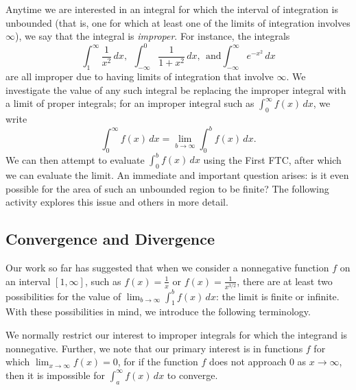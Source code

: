 Anytime we are interested in an integral for which the interval of integration is unbounded (that is, one for which at least one of the limits of integration involves $\infty$), we say that the integral is \emph{improper}.  For instance, the integrals
$$\int_1^{\infty} \frac{1}{x^2} \, dx, \ \ \int_{-\infty}^0 \frac{1}{1+x^2} \, dx, \ \ \mbox{and} \int_{-\infty}^{\infty} e^{-x^2} \, dx$$
are all improper due to having limits of integration that involve $\infty$.  We investigate the value of any such integral be replacing the improper integral with a limit of proper integrals; for an improper integral such as $\int_0^\infty f(x) \, dx$, we write
$$\int_0^\infty f(x) \, dx = \lim_{b \to \infty} \int_0^b f(x) \,dx.$$
We can then attempt to evaluate $\int_0^b f(x) \,dx$ using the First FTC, after which we can evaluate the limit.  An immediate and important question arises: is it even possible for the area of such an unbounded region to be finite?  The following activity explores this issue and others in more detail.



\subsection*{Convergence and Divergence} 

Our work so far has suggested that when we consider a nonnegative function $f$ on an interval $[1,\infty]$, such as $f(x) = \frac{1}{x}$ or $f(x) = \frac{1}{x^{3/2}}$, there are at least two possibilities for the value of $\lim_{b \to \infty} \int_1^b f(x) \, dx$:  the limit is finite or infinite.  With these possibilities in mind, we introduce the following terminology.

\vspace*{5pt}
\nin {}
\vspace*{1pt}

We normally restrict our interest to improper integrals for which the integrand is nonnegative.  Further, we note that our primary interest is in functions $f$ for which $\lim_{x \to \infty} f(x) = 0$, for if the function $f$ does not approach $0$ as $x \to \infty$, then it is impossible for $\int_a^{\infty} f(x) \, dx$ to converge.

